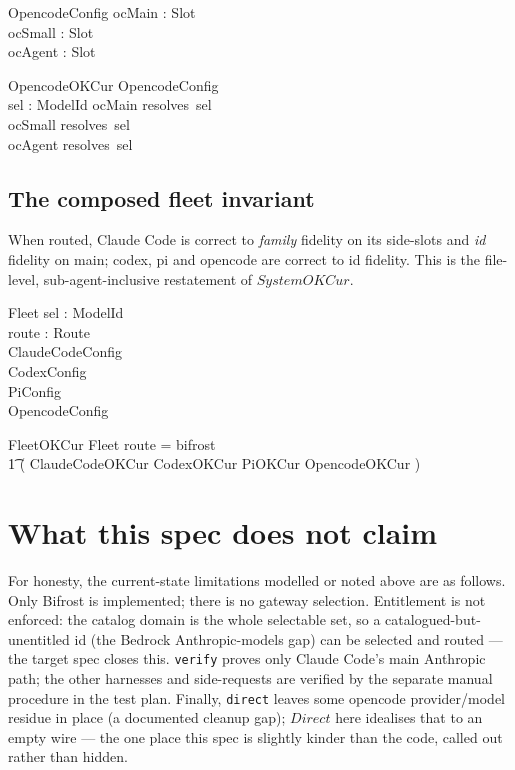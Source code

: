 \documentclass{article}
\begin{document}
\begin{schema}{OpencodeConfig}
  ocMain : Slot \\
  ocSmall : Slot \\
  ocAgent : Slot
\end{schema}

\begin{schema}{OpencodeOKCur}
  OpencodeConfig \\
  sel : ModelId
\where
  ocMain \in resolves~sel \\
  ocSmall \in resolves~sel \\
  ocAgent \in resolves~sel
\end{schema}

\subsection{The composed fleet invariant}

When routed, Claude Code is correct to \emph{family} fidelity on its side-slots
and \emph{id} fidelity on main; codex, pi and opencode are correct to id
fidelity. This is the file-level, sub-agent-inclusive restatement of
$SystemOKCur$.

\begin{schema}{Fleet}
  sel : ModelId \\
  route : Route \\
  ClaudeCodeConfig \\
  CodexConfig \\
  PiConfig \\
  OpencodeConfig
\end{schema}

\begin{schema}{FleetOKCur}
  Fleet
\where
  route = bifrost \implies \\
  \t1 ( ClaudeCodeOKCur \land CodexOKCur \land PiOKCur \land OpencodeOKCur )
\end{schema}

\section{What this spec does not claim}

For honesty, the current-state limitations modelled or noted above are as
follows. Only Bifrost is implemented; there is no gateway selection.
Entitlement is not enforced: the catalog domain is the whole selectable set, so
a catalogued-but-unentitled id (the Bedrock Anthropic-models gap) can be
selected and routed --- the target spec closes this. \texttt{verify} proves
only Claude Code's main Anthropic path; the other harnesses and side-requests
are verified by the separate manual procedure in the test plan. Finally,
\texttt{direct} leaves some opencode provider/model residue in place (a
documented cleanup gap); $Direct$ here idealises that to an empty wire --- the
one place this spec is slightly kinder than the code, called out rather than
hidden.
\end{document}
